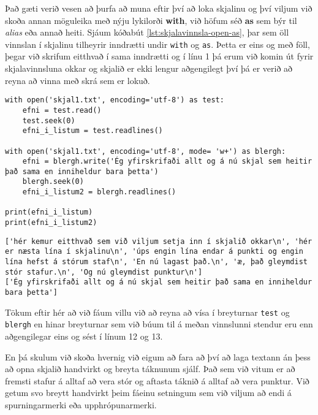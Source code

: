 Það gæti verið vesen að þurfa að muna eftir því að loka skjalinu og því viljum við skoða annan möguleika með nýju lykilorði \textbf{with}, við höfum séð \textbf{as} sem býr til \textit{alias} eða annað heiti.
Sjáum kóðabút \ref{lst:skjalavinnsla-open-as}, þar sem öll vinnslan í skjalinu tilheyrir inndrætti undir \texttt{with} og \texttt{as}.
Þetta er eins og með föll, þegar við skrifum eitthvað í sama inndrætti og í línu 1 þá erum við komin út fyrir skjalavinnsluna okkar og skjalið er ekki lengur aðgengilegt því þá er verið að reyna að vinna með skrá sem er lokuð.
 
\begin{lstlisting}[caption=Hér sjáum við nýja leið til að opna skjal og loka því sjálfkrafa, label=lst:skjalavinnsla-open-as]
with open('skjal1.txt', encoding='utf-8') as test:
	efni = test.read()
	test.seek(0)
	efni_i_listum = test.readlines()

with open('skjal1.txt', encoding='utf-8', mode= 'w+') as blergh:
	efni = blergh.write('Ég yfirskrifaði allt og á nú skjal sem heitir það sama en inniheldur bara þetta')
	blergh.seek(0)
	efni_i_listum2 = blergh.readlines()

print(efni_i_listum)
print(efni_i_listum2)
\end{lstlisting}
\lstset{style=uttak}
\begin{lstlisting}
['hér kemur eitthvað sem við viljum setja inn í skjalið okkar\n', 'hér er næsta lína í skjalinu\n', 'úps engin lína endar á punkti og engin lína hefst á stórum staf\n', 'En nú lagast það.\n', 'æ, það gleymdist stór stafur.\n', 'Og nú gleymdist punktur\n']
['Ég yfirskrifaði allt og á nú skjal sem heitir það sama en inniheldur bara þetta']
\end{lstlisting}
\lstset{style=venjulegt}

Tökum eftir hér að við fáum villu við að reyna að vísa í breyturnar \texttt{test} og \texttt{blergh} en hinar breyturnar sem við búum til á meðan vinnslunni stendur eru enn aðgengilegar eins og sést í línum 12 og 13.

En þá skulum við skoða hvernig við eigum að fara að því að laga textann án þess að opna skjalið handvirkt og breyta táknunum sjálf.
Það sem við vitum er að fremsti stafur á alltaf að vera stór og aftasta táknið á alltaf að vera punktur.
Við getum svo breytt handvirkt þeim fáeinu setningum sem við viljum að endi á spurningarmerki eða upphrópunarmerki.

